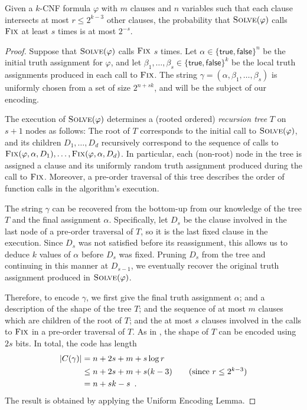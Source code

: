 \documentclass{patmorin}
\begin{document}
\begin{thm}
%
  Given a $k$-CNF formula $\varphi$ with $m$ clauses and $n$ variables
  such that each clause intersects at most $r \le 2^{k - 3}$ other
  clauses, the probability that $\textsc{Solve}(\varphi)$ calls
  $\textsc{Fix}$ at least $s$ times is at most $2^{-s}$.
\end{thm}
\begin{proof}
  Suppose that $\textsc{Solve}(\varphi)$ calls $\textsc{Fix}$ $s$
  times. Let $\alpha \in \{\textsf{true}, \textsf{false}\}^n$ be the
  initial truth assignment for $\varphi$, and let
  $\beta_1, \ldots, \beta_s \in \{\textsf{true}, \textsf{false}\}^k$
  be the local truth assignments produced in each call to
  $\textsc{Fix}$. The string
  $\gamma = (\alpha, \beta_1, \ldots, \beta_s)$ is uniformly chosen
  from a set of size $2^{n + sk}$, and will be the subject of our
  encoding.

  The execution of $\textsc{Solve}(\varphi)$ determines a (rooted
  ordered) \emph{recursion tree} $T$ on $s + 1$ nodes as follows: The
  root of $T$ corresponds to the initial call to
  $\textsc{Solve}(\varphi)$, and its children $D_1, \ldots, D_d$
  recursively correspond to the sequence of calls to
  $\textsc{Fix}(\varphi, \alpha, D_1), \ldots, \textsc{Fix}(\varphi,
  \alpha, D_d)$. In particular, each (non-root) node in the tree is
  assigned a clause and its uniformly random truth assignment produced
  during the call to $\textsc{Fix}$. Moreover, a pre-order traversal
  of this tree describes the order of function calls in the
  algorithm's execution.

  The string $\gamma$ can be recovered from the bottom-up from our
  knowledge of the tree $T$ and the final assignment
  $\alpha$. Specifically, let $D_s$ be the clause involved in the last
  node of a pre-order traversal of $T$, so it is the last fixed clause
  in the execution. Since $D_s$ was not satisfied before its
  reassignment, this allows us to deduce $k$ values of $\alpha$ before
  $D_s$ was fixed. Pruning $D_s$ from the tree and continuing in this
  manner at $D_{s - 1}$, we eventually recover the original truth
  assignment produced in $\textsc{Solve}(\varphi)$.

  Therefore, to encode $\gamma$, we first give the final truth
  assignment $\alpha$; and a description of the shape of the tree $T$;
  and the sequence of at most $m$ clauses which are children of the
  root of $T$; and the at most $s$ clauses involved in the calls to
  $\textsc{Fix}$ in a pre-order traversal of $T$. As in
  , the shape of $T$ can be encoded
  using $2s$ bits. In total, the code has length
  \begin{align*}
    |C(\gamma)| &= n + 2s + m + s \log r \\
                &\le n + 2s + m + s(k - 3) \tag{since $r \le 2^{k - 3}$} \\
                &= n + sk - s \enspace .
  \end{align*}
  The result is obtained by applying the Uniform Encoding Lemma.
\end{proof}
\end{document}
